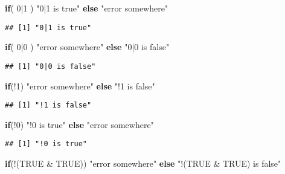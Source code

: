 \documentclass[
]{article}
\newenvironment{Shaded}{\begin{snugshade}}{\end{snugshade}}
\newcommand{\ConstantTok}[1]{\textcolor[rgb]{0.00,0.00,0.00}{#1}}
\newcommand{\ControlFlowTok}[1]{\textcolor[rgb]{0.13,0.29,0.53}{\textbf{#1}}}
\newcommand{\DecValTok}[1]{\textcolor[rgb]{0.00,0.00,0.81}{#1}}
\newcommand{\NormalTok}[1]{#1}
\newcommand{\SpecialCharTok}[1]{\textcolor[rgb]{0.00,0.00,0.00}{#1}}
\newcommand{\StringTok}[1]{\textcolor[rgb]{0.31,0.60,0.02}{#1}}
\begin{document}
\begin{Shaded}
\begin{Highlighting}[]
\ControlFlowTok{if}\NormalTok{( }\DecValTok{0}\SpecialCharTok{|}\DecValTok{1}\NormalTok{ ) }\StringTok{"0|1 is true"} \ControlFlowTok{else} \StringTok{"error somewhere"}
\end{Highlighting}
\end{Shaded}

\begin{verbatim}
## [1] "0|1 is true"
\end{verbatim}

\begin{Shaded}
\begin{Highlighting}[]
\ControlFlowTok{if}\NormalTok{( }\DecValTok{0}\SpecialCharTok{|}\DecValTok{0}\NormalTok{ ) }\StringTok{"error somewhere"} \ControlFlowTok{else} \StringTok{"0|0 is false"}
\end{Highlighting}
\end{Shaded}

\begin{verbatim}
## [1] "0|0 is false"
\end{verbatim}

\begin{Shaded}
\begin{Highlighting}[]
\ControlFlowTok{if}\NormalTok{(}\SpecialCharTok{!}\DecValTok{1}\NormalTok{) }\StringTok{"error somewhere"} \ControlFlowTok{else} \StringTok{"!1 is false"}
\end{Highlighting}
\end{Shaded}

\begin{verbatim}
## [1] "!1 is false"
\end{verbatim}

\begin{Shaded}
\begin{Highlighting}[]
\ControlFlowTok{if}\NormalTok{(}\SpecialCharTok{!}\DecValTok{0}\NormalTok{) }\StringTok{"!0 is true"} \ControlFlowTok{else} \StringTok{"error somewhere"}
\end{Highlighting}
\end{Shaded}

\begin{verbatim}
## [1] "!0 is true"
\end{verbatim}

\begin{Shaded}
\begin{Highlighting}[]
\ControlFlowTok{if}\NormalTok{(}\SpecialCharTok{!}\NormalTok{(}\ConstantTok{TRUE} \SpecialCharTok{\&} \ConstantTok{TRUE}\NormalTok{)) }\StringTok{"error somewhere"} \ControlFlowTok{else} \StringTok{"!(TRUE \& TRUE) is false"}
\end{Highlighting}
\end{Shaded}
\end{document}
